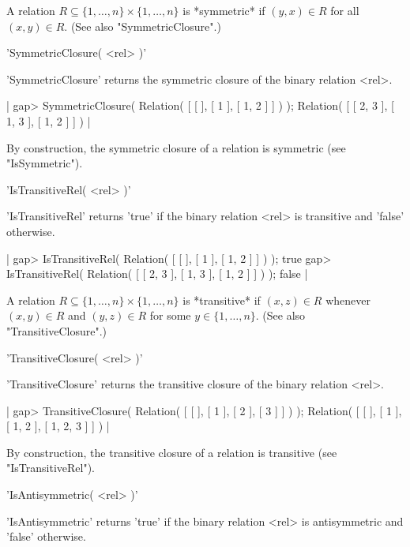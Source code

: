 A relation $R  \subseteq  \{1, \dots,   n\}  \times \{1, \dots,  n\}$  is
*symmetric* if  $(y,  x)  \in R$ for  all   $(x, y)  \in R$.   (See  also
"SymmetricClosure".)


'SymmetricClosure( <rel> )'

'SymmetricClosure' returns the  symmetric closure of the binary  relation
<rel>.

|    gap> SymmetricClosure( Relation( [ [ ], [ 1 ], [ 1, 2 ] ] ) );        
    Relation( [ [ 2, 3 ], [ 1, 3 ], [ 1, 2 ] ] ) |

By construction,  the symmetric closure of a  relation is  symmetric (see
"IsSymmetric").

%

'IsTransitiveRel( <rel> )'

'IsTransitiveRel'  returns  'true' if    the   binary relation  <rel>  is
transitive and 'false' otherwise.

|    gap> IsTransitiveRel( Relation( [ [ ], [ 1 ], [ 1, 2 ] ] ) );    
    true
    gap> IsTransitiveRel( Relation( [ [ 2, 3 ], [ 1, 3 ], [ 1, 2 ] ] ) );
    false |

A  relation $R   \subseteq \{1, \dots,   n\}  \times \{1,  \dots, n\}$ is
*transitive* if $(x, z) \in R$ whenever $(x, y) \in R$ and $(y, z) \in R$
for some $y \in \{1, \dots, n\}$.  (See also "TransitiveClosure".)


'TransitiveClosure( <rel> )'

'TransitiveClosure' returns the transitive closure of the binary relation
<rel>.

|    gap> TransitiveClosure( Relation( [ [ ], [ 1 ], [ 2 ], [ 3 ] ] ) );
    Relation( [ [  ], [ 1 ], [ 1, 2 ], [ 1, 2, 3 ] ] ) |

By construction, the transitive closure  of a relation is transitive (see
"IsTransitiveRel").

%

'IsAntisymmetric( <rel> )'

'IsAntisymmetric'  returns 'true'    if the  binary  relation <rel>    is
antisymmetric and 'false' otherwise.

